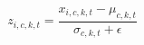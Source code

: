
\begin{equation}
z_{i,c,k,t} = \frac{x_{i,c,k,t} - \mu_{c,k,t}}{\sigma_{c,k,t} + \epsilon}
\end{equation}

